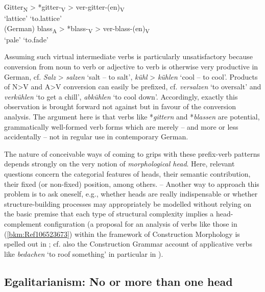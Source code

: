 \documentclass[output=paper
  ,nobabel
  ,draftmode
  ,colorlinks, citecolor=brown
]{langscibook}
\begin{document}
\eal
\ex
\gll Gitter\textsubscript{N}    >    *gitter-\textsubscript{V}    >   ver-gitter-(en)\textsubscript{V}\\
     `lattice'                 {}    {}                           {}  `to.lattice'\\\hfill(German)
\ex
\gll blass\textsubscript{A}    >     *blass-\textsubscript{V}   >    ver-blass-(en)\textsubscript{V}\\
       `pale'                  {}    {}                         {}   `to.fade' \\
\zl

\noindent
Assuming such virtual intermediate verbs is particularly unsatisfactory because conversion from noun
to verb or adjective to verb is otherwise very productive in German, cf. \emph{Salz} > \emph{salzen}
`salt – to salt', \emph{kühl} > \emph{kühlen} `cool – to cool'. Products of N>V and A>V conversion
can easily be prefixed, cf. \emph{versalzen} `to oversalt' and \emph{verkühlen} `to get a chill',
\emph{abkühlen} `to cool down'. Accordingly, exactly this observation is brought forward not against
but in favour of the conversion analysis. The argument here is that verbs like *\emph{gittern} and
*\emph{blassen} are potential, grammatically well-formed verb forms which are merely – and more or
less accidentally – not in regular use in contemporary German.

The nature of conceivable ways of coming to grips with these prefix-verb patterns depends strongly
on the very notion of \emph{morphological head}. Here, relevant questions concern the categorial
features of heads, their semantic contribution, their fixed (or non-fixed) position, among others. –
Another way to approach this problem is to ask oneself, e.g., whether heads are really indispensable
or whether structure-building processes may appropriately be modelled without relying on the basic
premise that each type of structural complexity implies a head-complement configuration (a proposal
for an analysis of verbs like those in (\ref{bkm:Ref106523673}) within the framework of Construction
Morphology is spelled out in \citealt{Michel2014}; cf. also the Construction Grammar account of
applicative verbs like \emph{bedachen} `to roof something' in particular in
\citealt{MichaelisRuppenhofer2001}).

\subsection{Egalitarianism: No or more than one head}
\end{document}
